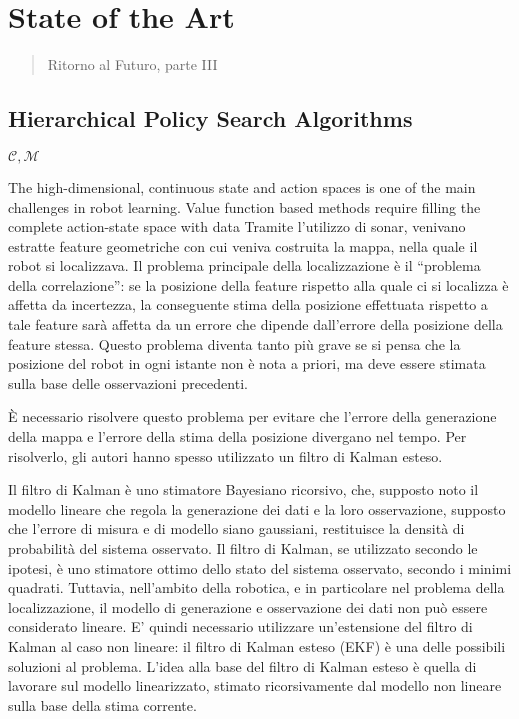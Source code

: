 \chapter{State of the Art}
\label{cap:statoArte}
\thispagestyle{empty}

\begin{quotation}
{\footnotesize
{}
\begin{flushright}
Ritorno al Futuro, parte III
\end{flushright}
}
\end{quotation}
\vspace{0.5cm}

\section{Hierarchical Policy Search Algorithms}

$\mathcal{C},\mathcal{M}$

The high-dimensional, continuous state and action spaces is one of the main challenges in robot learning. Value function based methods require filling the complete action-state space with data
Tramite l'utilizzo di sonar, venivano estratte feature geometriche con cui veniva costruita la mappa, nella quale il robot si localizzava. 
Il problema principale della localizzazione è il ``problema della correlazione'': se la posizione della feature rispetto alla quale ci si localizza è affetta da incertezza, la conseguente stima della posizione effettuata rispetto a tale feature sarà affetta da un errore che dipende dall'errore della posizione della feature stessa. 
Questo problema diventa tanto più grave se si pensa che la posizione del robot in ogni istante non è nota a priori, ma deve essere stimata sulla base delle osservazioni precedenti. 

\`E necessario risolvere questo problema per evitare che l'errore della generazione della mappa e l'errore della stima della posizione divergano nel tempo. 
Per risolverlo, gli autori hanno spesso utilizzato un filtro di Kalman esteso.

Il filtro di Kalman è uno stimatore Bayesiano ricorsivo, che, supposto noto il modello lineare che regola la generazione dei dati e la loro osservazione, supposto che l'errore di misura e di modello siano gaussiani, restituisce la densità di probabilità del sistema osservato. 
Il filtro di Kalman, se utilizzato secondo le ipotesi, è uno stimatore ottimo dello stato del sistema osservato, secondo i minimi quadrati.
Tuttavia, nell'ambito della robotica, e in particolare nel problema della localizzazione, il modello di generazione e osservazione dei dati non può essere considerato lineare.
E' quindi necessario utilizzare un'estensione del filtro di Kalman al caso non lineare: il filtro di Kalman esteso (EKF) è una delle possibili soluzioni al problema. 
L'idea alla base del filtro di Kalman esteso è quella di lavorare sul modello linearizzato, stimato ricorsivamente dal modello non lineare sulla base della stima corrente.

